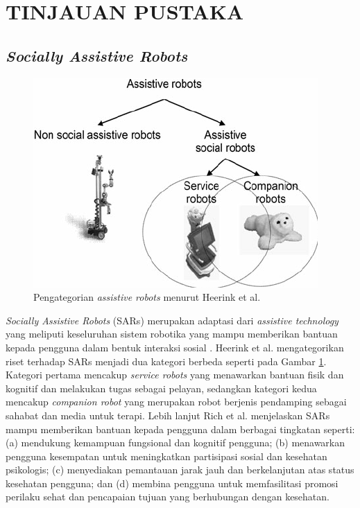 \section{TINJAUAN PUSTAKA}

\subsection{\emph{Socially Assistive Robots}}

\begin{figure} [ht] \centering
	\includegraphics[scale=0.45]{gambar/robots-category.png}
	\caption{Pengategorian \emph{assistive robots} menurut Heerink et al. \citep{Heerink2010}}
	\label{fig:RobotsCategory}
\end{figure}

\emph{Socially Assistive Robots} (SARs) merupakan adaptasi dari \emph{assistive technology} yang meliputi keseluruhan sistem robotika yang mampu memberikan bantuan kepada pengguna dalam bentuk interaksi sosial \citep{Seifer2005}. Heerink et al. \citep{Heerink2010} mengategorikan riset terhadap SARs menjadi dua kategori berbeda seperti pada Gambar \ref{fig:RobotsCategory}.
Kategori pertama mencakup \emph{service robots} yang menawarkan bantuan fisik dan kognitif dan melakukan tugas sebagai pelayan, sedangkan kategori kedua mencakup \emph{companion robot} yang merupakan robot berjenis pendamping sebagai sahabat dan media untuk terapi.
Lebih lanjut Rich et al. \citep{Rich2009} menjelaskan SARs mampu memberikan bantuan kepada pengguna dalam berbagai tingkatan seperti:
(a) mendukung kemampuan fungsional dan kognitif pengguna;
(b) menawarkan pengguna kesempatan untuk meningkatkan partisipasi sosial dan kesehatan psikologis;
(c) menyediakan pemantauan jarak jauh dan berkelanjutan atas status kesehatan pengguna;
dan (d) membina pengguna untuk memfasilitasi promosi perilaku sehat dan pencapaian tujuan yang berhubungan dengan kesehatan.

